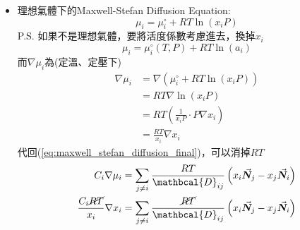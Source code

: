\documentclass[../main.tex]{subfiles}
\begin{document}
\begin{itemize}
\begin{itemize}
\begin{align}
      \right) \nonumber\\
      &= \sum_{j\neq i} \frac{C_i C_jRT}{C \mathbcal{D}_{ij}} \left(
        \frac{\vec{\bm N}_j}{C_j} - \frac{\vec{\bm N}_i}{C_i}
      \right) \nonumber\\
      &= \sum_{j\neq i} \frac{C_i C_jRT}{C \mathbcal{D}_{ij}} \left(
        \frac{\vec{\bm N}_jC_i - \vec{\bm N}_iC_j}{C_iC_j}
      \right)\nonumber\\
      &= \sum_{j\neq i} \frac{ RT}{C\mathbcal{D}_{ij}}
      \left(\vec{\bm N}_jC_i - \vec{\bm N}_iC_j\right)
    \end{align}
    把整體總濃度$C$移入括號內$\frac{C_i}{C} = X_i$\\
    即為物質$i$的莫耳分率
    \begin{equation}
      \boxed{C_i \nabla \mu_i = \sum_{j\neq i} \frac{ RT}{\mathbcal{D}_{ij}}
      \left(x_i \vec{\bm N}_j - x_j \vec{\bm N}_i\right)} \label{eq:maxwell_stefan_diffusion_final}
    \end{equation}
    \item 理想氣體下的Maxwell-Stefan Diffusion Equation:
    \begin{equation}
      \mu_i = \mu_i^\circ + RT \ln (x_i P)
    \end{equation}
    P.S. 如果不是理想氣體，要將活度係數考慮進去，換掉$x_i$
    \begin{equation}
      \mu_i = \mu_i^\circ(T,P) + RT \ln (a_i) \label{eq:chemical_potential_non_ideal}
    \end{equation}
    而$\nabla \mu_i$為(定溫、定壓下)
    \begin{align}
      \nabla \mu_i &= \nabla \left(
        \mu_i^\circ + RT \ln( x_i P)
      \right) \nonumber\\
      &= RT \nabla \ln (x_i P) \nonumber\\
      &= RT \left(\frac{1}{x_i P}\cdot P \nabla x_i\right) \nonumber\\
      &= \frac{RT}{x_i} \nabla x_i \label{eq:chemical_potential_gradient_ideal_gas}
    \end{align}
    代回(\ref{eq:maxwell_stefan_diffusion_final})，可以消掉$RT$
    \begin{align}
      C_i \nabla \mu_i &= \sum_{j\neq i} \frac{ RT}{\mathbcal{D}_{ij}}
      \left(x_i \vec{\bm N}_j - x_j \vec{\bm N}_i\right) \nonumber\\
      \frac{C_i \cancel{RT}}{x_i} \nabla x_i &= \sum_{j\neq i} \frac{\cancel{RT}}{\mathbcal{D}_{ij}}
      \left(x_i \vec{\bm N}_j - x_j \vec{\bm N}_i\right) \nonumber\\

\end{align}
\end{itemize}
\end{itemize}
\end{document}
